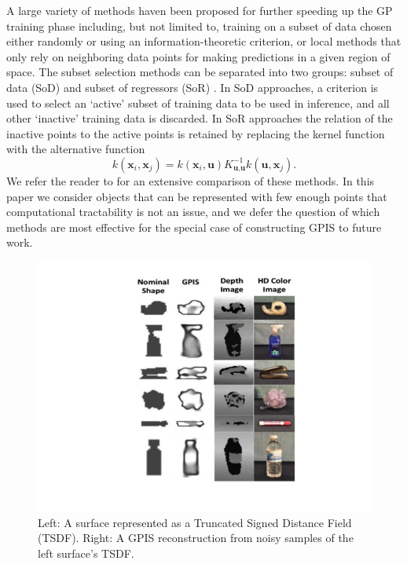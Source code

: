 \documentclass[letterpaper, 10 pt, conference]{ieeeconf}  %
\begin{document}
A large variety of methods haven been proposed for further speeding up the GP training phase including, but not limited to, training on a subset of data chosen either randomly or using an information-theoretic criterion, or local methods that only rely on neighboring data points for making predictions in a given region of space.
The subset selection methods can be separated into two groups: subset of data (SoD) and subset of regressors (SoR) \cite{quinonero2005unifying}.
In SoD approaches, a criterion is used to select an `active' subset of training data to be used in inference, and all other `inactive' training data is discarded.
In SoR approaches the relation of the inactive points to the active points is retained by replacing the kernel function with the alternative function
\begin{equation}
	k(\textbf{x}_i,\textbf{x}_j) = k(\textbf{x}_i,\textbf{u}) K_{\textbf{u}, \textbf{u}}^{-1} k(\textbf{u},\textbf{x}_j).
\end{equation}
\noindent We refer the reader to \cite{chalupka2013} for an extensive comparison of these methods. In this paper we consider objects that can be represented with few enough points that computational tractability is not an issue, and we defer the question of which methods are most effective for the special case of constructing GPIS to future work.

\begin{figure}[ht!]
\centering
\includegraphics[scale = 0.3]{figures/Slide03.jpg}
\caption{Left: A surface represented as a Truncated Signed Distance Field (TSDF).
Right: A GPIS reconstruction from noisy samples of the left surface's TSDF.}
\vspace*{-10pt}
\label{fig:GPIS_TSDF}
\end{figure}
\end{document}
